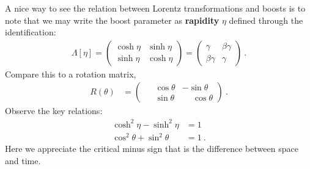 \documentclass[12pt, oneside]{report}    %
\begin{document}
\begin{example}
A nice way to see the relation between Lorentz transformations and boosts is to note that we may write the boost parameter as \textbf{rapidity} $\eta$ defined through the identification:
\begin{align}
    \Lambda[\eta] = 
    \begin{pmatrix}
        \cosh \eta & \sinh \eta \\
        \sinh \eta & \cosh \eta
    \end{pmatrix}
    =
    \begin{pmatrix}
        \gamma & \beta\gamma \\
        \beta \gamma & \gamma
    \end{pmatrix} \ .
\end{align}
Compare this to a rotation matrix,
\begin{align}
    R(\theta) &=
    \begin{pmatrix}
        \phantom{+}\cos \theta & -\sin\theta \\
        \phantom{+}\sin \theta & \phantom{+}\cos\theta
    \end{pmatrix} \ .
    \label{eq:eg:rotations}
\end{align}
Observe the key relations:
\begin{align}
    \cosh^2 \eta - \sinh^2 \eta &= 1\\
    \cos^2 \theta + \sin^2 \theta &=1 \ .
\end{align}
Here we appreciate the critical minus sign that is the difference between space and time.\sidenotemark
\end{example}
\end{document}
